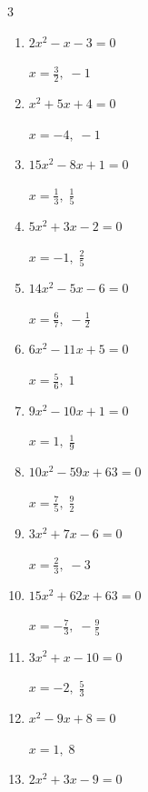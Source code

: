 \begin{multicols}{3}
\begin{enumerate}
        $\displaystyle x=-\frac{9}{7},\; \frac{7}{4}$

  \item $2x^{2}-x-3=0$

        $\displaystyle x=\frac{3}{2},\; -1$

  \item $x^{2}+5x+4=0$

        $\displaystyle x=-4,\; -1$

  \item $15x^{2}-8x+1=0$

        $\displaystyle x=\frac{1}{3},\; \frac{1}{5}$

  \item $5x^{2}+3x-2=0$

        $\displaystyle x=-1,\; \frac{2}{5}$

\columnbreak %

\resetques

  \item $14x^{2}-5x-6=0$

        $\displaystyle x=\frac{6}{7},\; -\frac{1}{2}$

  \item $6x^{2}-11x+5=0$

        $\displaystyle x=\frac{5}{6},\; 1$

  \item $9x^{2}-10x+1=0$

        $\displaystyle x=1,\; \frac{1}{9}$

  \item $10x^{2}-59x+63=0$

        $\displaystyle x=\frac{7}{5},\; \frac{9}{2}$

  \item $3x^{2}+7x-6=0$

        $\displaystyle x=\frac{2}{3},\; -3$

  \item $15x^{2}+62x+63=0$

        $\displaystyle x=-\frac{7}{3},\; -\frac{9}{5}$

  \item $3x^{2}+x-10=0$

        $\displaystyle x=-2,\; \frac{5}{3}$

  \item $x^{2}-9x+8=0$

        $\displaystyle x=1,\; 8$

  \item $2x^{2}+3x-9=0$


\end{enumerate}
\end{multicols}
